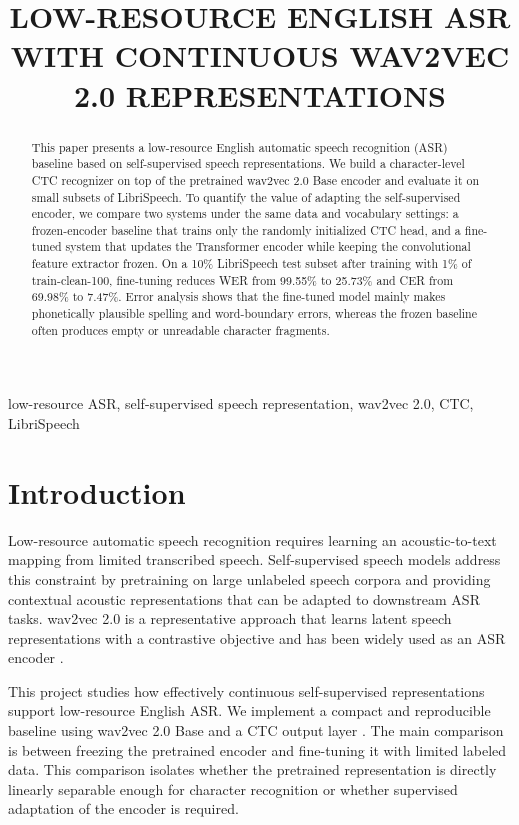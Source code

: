 \documentclass{article}
\title{LOW-RESOURCE ENGLISH ASR WITH CONTINUOUS WAV2VEC 2.0 REPRESENTATIONS}
\begin{document}
\maketitle

\begin{abstract}
This paper presents a low-resource English automatic speech recognition (ASR) baseline based on self-supervised speech representations. We build a character-level CTC recognizer on top of the pretrained wav2vec 2.0 Base encoder and evaluate it on small subsets of LibriSpeech. To quantify the value of adapting the self-supervised encoder, we compare two systems under the same data and vocabulary settings: a frozen-encoder baseline that trains only the randomly initialized CTC head, and a fine-tuned system that updates the Transformer encoder while keeping the convolutional feature extractor frozen. On a 10\% LibriSpeech test subset after training with 1\% of train-clean-100, fine-tuning reduces WER from 99.55\% to 25.73\% and CER from 69.98\% to 7.47\%. Error analysis shows that the fine-tuned model mainly makes phonetically plausible spelling and word-boundary errors, whereas the frozen baseline often produces empty or unreadable character fragments.
\end{abstract}

\begin{keywords}
low-resource ASR, self-supervised speech representation, wav2vec 2.0, CTC, LibriSpeech
\end{keywords}

\section{Introduction}
\label{sec:intro}

Low-resource automatic speech recognition requires learning an acoustic-to-text mapping from limited transcribed speech. Self-supervised speech models address this constraint by pretraining on large unlabeled speech corpora and providing contextual acoustic representations that can be adapted to downstream ASR tasks. wav2vec 2.0 is a representative approach that learns latent speech representations with a contrastive objective and has been widely used as an ASR encoder \cite{baevski2020wav2vec}.

This project studies how effectively continuous self-supervised representations support low-resource English ASR. We implement a compact and reproducible baseline using wav2vec 2.0 Base and a CTC output layer \cite{graves2006ctc}. The main comparison is between freezing the pretrained encoder and fine-tuning it with limited labeled data. This comparison isolates whether the pretrained representation is directly linearly separable enough for character recognition or whether supervised adaptation of the encoder is required.
\end{document}
